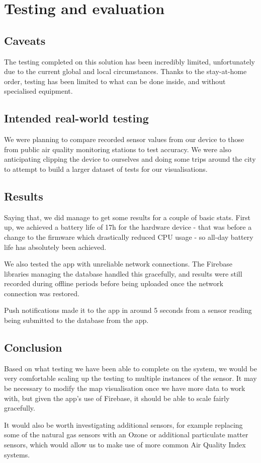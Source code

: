 \documentclass[sigconf, nonacm]{acmart}
\begin{document}
\section{Testing and evaluation}

\subsection{Caveats}

The testing completed on this solution has been incredibly limited, unfortunately due to the current
global and local circumstances. Thanks to the stay-at-home order, testing has been limited to what
can be done inside, and without specialised equipment.

\subsection{Intended real-world testing}

We were planning to compare recorded sensor values from our device to those from public air quality
monitoring stations to test accuracy. We were also anticipating clipping the device to ourselves and
doing some trips around the city to attempt to build a larger dataset of tests for our visualisations.

\subsection{Results}

Saying that, we did manage to get some results for a couple of basic stats. First up, we achieved a 
battery life of 17h for the hardware device - that was before a change to the firmware which 
drastically reduced CPU usage - so all-day battery life has absolutely been achieved.

We also tested the app with unreliable network connections. The Firebase libraries managing the
database handled this gracefully, and results were still recorded during offline periods before
being uploaded once the network connection was restored.

Push notifications made it to the app in around 5 seconds from a sensor reading being submitted to
the database from the app.

\subsection{Conclusion}

Based on what testing we have been able to complete on the system, we would be very comfortable
scaling up the testing to multiple instances of the sensor. It may be necessary to modify the 
map visualisation once we have more data to work with, but given the app's use of Firebase, 
it should be able to scale fairly gracefully.

It would also be worth investigating additional sensors, for example replacing some of the
natural gas sensors with an Ozone or additional particulate matter sensors, which would
allow us to make use of more common Air Quality Index systems.

\pagebreak



\end{document}
